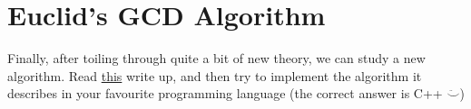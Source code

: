 \documentclass{article}
\begin{document}
\section{Euclid's GCD Algorithm}

Finally, after toiling through quite a bit of new theory, we can study a new algorithm.
Read
\href{https://www.khanacademy.org/computing/computer-science/cryptography/modarithmetic/a/the-euclidean-algorithm}{this}
write up, and then try to implement the algorithm it describes in your favourite programming language
(the correct answer is C++ $\ddot\smallsmile$)
\end{document}
